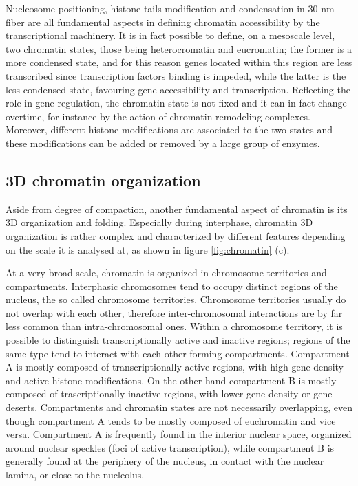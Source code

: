 Nucleosome positioning, histone tails modification and condensation in 30-nm fiber are all fundamental aspects in defining chromatin accessibility by the transcriptional machinery\cite{ chromatinfiber2015, histonemodification2007}. It is in fact possible to define, on a mesoscale level, two chromatin states, those being heterocromatin and eucromatin; the former is a more condensed state, and for this reason genes located within this region are less transcribed since transcription factors binding is impeded, while the latter is the less condensed state, favouring gene accessibility and transcription\cite{heterochromatin2020}. Reflecting the role in gene regulation, the chromatin state is not fixed and it can in fact change overtime, for instance by the action of chromatin remodeling complexes\cite{chromatinremodeling2021}. Moreover, different histone modifications are associated to the two states and these modifications can be added or removed by a large group of enzymes\cite{histonemodification2007, epigeneticbook2020}. 

\subsection{3D chromatin organization}
Aside from degree of compaction, another fundamental aspect of chromatin is its 3D organization and folding. Especially during interphase, chromatin 3D organization is rather complex and characterized by different features depending on the scale it is analysed at\cite{chromatinorganization2019, chromatindevelopment2019}, as shown in figure \ref{fig:chromatin} (c).

At a very broad scale, chromatin is organized in chromosome territories and compartments. Interphasic chromosomes tend to occupy distinct regions of the nucleus, the so called chromosome territories\cite{chromosometerritories2010}. Chromosome territories usually do not overlap with each other, therefore inter-chromosomal interactions are by far less common than intra-chromosomal ones. Within a chromosome territory, it is possible to distinguish transcriptionally active and inactive regions; regions of the same type tend to interact with each other forming compartments. Compartment A is mostly composed of transcriptionally active regions, with high gene density and active histone modifications. On the other hand compartment B is mostly composed of trascriptionally inactive regions, with lower gene density or gene deserts\cite{chromatindevelopment2019}. Compartments and chromatin states are not necessarily overlapping, even though compartment A tends to be mostly composed of euchromatin and vice versa. Compartment A is frequently found in the interior nuclear space, organized around nuclear speckles (foci of active transcription), while compartment B is generally found at the periphery of the nucleus, in contact with the nuclear lamina, or close to the nucleolus\cite{chromatinorganization2019, chromatindevelopment2019}.

